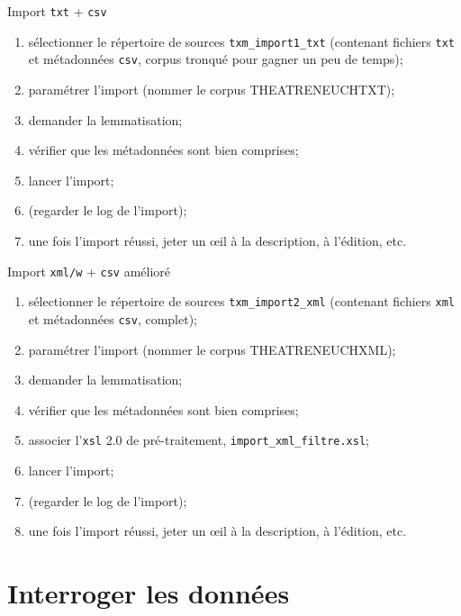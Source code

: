 \documentclass{beamer}
\begin{document}
\begin{frame}{Import \texttt{txt} + \texttt{csv}}
	
	\begin{enumerate}
		\item sélectionner le répertoire de sources \texttt{txm\_import1\_txt} (contenant fichiers \texttt{txt} et métadonnées \texttt{csv},
		corpus tronqué pour gagner un peu de temps);
		\item paramétrer l'import (nommer le corpus THEATRENEUCHTXT);
		\item demander la lemmatisation;
		\item vérifier que les métadonnées sont bien comprises;
		\item lancer l'import;
		\item (regarder le log de l'import);
		\item une fois l'import réussi, jeter un œil à la description, à l'édition, etc.
	\end{enumerate}
	
\end{frame}


\begin{frame}{Import \texttt{xml/w} + \texttt{csv} amélioré}

\begin{enumerate}
	\item sélectionner le répertoire de sources \texttt{txm\_import2\_xml} (contenant fichiers \texttt{xml} et métadonnées \texttt{csv},
complet);
	\item paramétrer l'import (nommer le corpus THEATRENEUCHXML);
	\item demander la lemmatisation;
	\item vérifier que les métadonnées sont bien comprises;
	\item \alert{associer l'\texttt{xsl} 2.0 de pré-traitement, \texttt{import\_xml\_filtre.xsl}};
	\item lancer l'import;
	\item (regarder le log de l'import);
	\item une fois l'import réussi, jeter un œil à la description, à l'édition, etc.
\end{enumerate}

\end{frame}


\section{Interroger les données}
\end{document}
